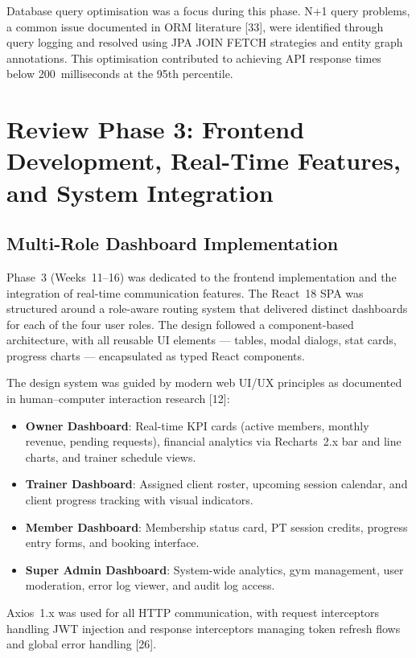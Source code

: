 \documentclass[
  12pt,
  a4paperpaper,
]{report}
\providecommand{\tightlist}{%
  \setlength{\itemsep}{0pt}\setlength{\parskip}{0pt}\setlength{\topsep}{2pt}\setlength{\partopsep}{0pt}}
\begin{document}
Database query optimisation was a focus during this phase. N+1 query
problems, a common issue documented in ORM literature {[}33{]},
were identified through query logging and resolved using JPA JOIN
FETCH strategies and entity graph annotations. This optimisation
contributed to achieving API response times below 200~milliseconds
at the 95th percentile.


\section{Review Phase 3: Frontend Development, Real-Time Features,
and System Integration}\label{review-phase-3}

\subsection{Multi-Role Dashboard
Implementation}\label{multi-role-dashboard}

Phase~3 (Weeks~11--16) was dedicated to the frontend implementation
and the integration of real-time communication features. The
React~18 SPA was structured around a role-aware routing system that
delivered distinct dashboards for each of the four user roles. The
design followed a component-based architecture, with all reusable UI
elements --- tables, modal dialogs, stat cards, progress charts ---
encapsulated as typed React components.

The design system was guided by modern web UI/UX principles as
documented in human--computer interaction research {[}12{]}:

\begin{itemize}
\tightlist
\item \textbf{Owner Dashboard}: Real-time KPI cards (active members,
  monthly revenue, pending requests), financial analytics via
  Recharts~2.x bar and line charts, and trainer schedule views.
\item \textbf{Trainer Dashboard}: Assigned client roster, upcoming
  session calendar, and client progress tracking with visual
  indicators.
\item \textbf{Member Dashboard}: Membership status card, PT session
  credits, progress entry forms, and booking interface.
\item \textbf{Super Admin Dashboard}: System-wide analytics, gym
  management, user moderation, error log viewer, and audit log
  access.
\end{itemize}

Axios~1.x was used for all HTTP communication, with request
interceptors handling JWT injection and response interceptors
managing token refresh flows and global error handling {[}26{]}.
\end{document}
